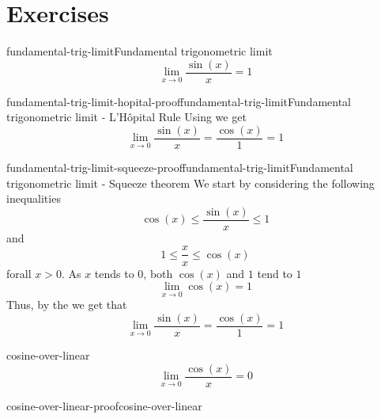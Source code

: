 \documentclass[preview]{standalone}
\begin{document}
\genpage

\section{Exercises}

\begin{snippetproposition}{fundamental-trig-limit}{Fundamental trigonometric limit}
    \[
        \lim_{x \to 0} \frac{\sin(x)}{x} = 1
    \]
\end{snippetproposition}

\begin{snippetproof}{fundamental-trig-limit-hopital-proof}{fundamental-trig-limit}{Fundamental trigonometric limit - L'Hôpital Rule}
    Using \lhopitalrule we get
    \[
        \lim_{x \to 0} \frac{\sin(x)}{x} = \frac{\cos(x)}{1} = 1
    \]
\end{snippetproof}

\begin{snippetproof}{fundamental-trig-limit-squeeze-proof}{fundamental-trig-limit}{Fundamental trigonometric limit - Squeeze theorem}
    We start by considering the following inequalities
    \[ \cos(x) \leq \frac{\sin(x)}{x} \leq 1 \]
    and
    \[ 1 \leq \frac{x}{x} \leq \cos(x) \]
    forall \(x>0\).
    As \(x\) tends to \(0\), both \(\cos(x)\) and \(1\) tend to \(1\)
    \[ \lim_{x\to 0} \cos(x)=1 \]
    Thus, by the \squeezetheorem we get that
    \[
        \lim_{x \to 0} \frac{\sin(x)}{x} = \frac{\cos(x)}{1} = 1
    \]
\end{snippetproof}

\begin{snippetproposition}{cosine-over-linear}{}
    \[
        \lim_{x \to 0} \frac{\cos(x)}{x} = 0
    \]
\end{snippetproposition}


\begin{snippetproof}{cosine-over-linear-proof}{cosine-over-linear}{}
    \todo
\end{snippetproof}
\end{document}
